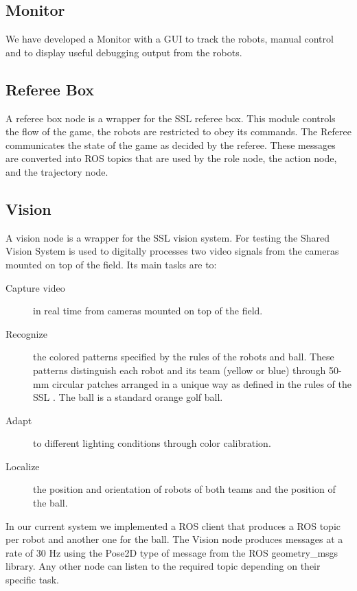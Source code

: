\documentclass[]{llncs}
\newcommand{\TODO}[1]{{\textcolor{blue}{ToDo: {#1}}}}
\begin{document}
\subsection{Monitor}
We have developed a Monitor with a GUI to track the robots, manual control and to display useful debugging output from the robots. 



\subsection{Referee Box}
A referee box node is a wrapper for the SSL referee box. This module controls the flow of the game, the robots are restricted to obey its commands. The Referee communicates the state of the game as decided by the referee. These messages are converted into ROS topics that are used by the role node, the action node, and the trajectory node.


\subsection{Vision}
A vision node is a wrapper for the SSL vision system. For testing the Shared Vision System \cite{zlbwv-sslvtsvsftrcssl-RoboCup-2009} is used to digitally processes two video signals from the cameras mounted on top of the field. Its main tasks are to:
\begin{description}
	\item[Capture video] in real time from cameras mounted on top of the field.
	\item[Recognize] the colored patterns specified by the rules of the robots and ball. These patterns distinguish each robot and its team (yellow or blue) through 50-mm circular patches arranged in a unique way as defined in the rules of the SSL \cite{robocup-ssl-rules}. The ball is a standard orange golf ball.
	\item[Adapt] to different lighting conditions through color calibration.
	\item[Localize] the position and orientation of robots of both teams and the position of the ball.
\end{description}

In our current system we implemented a ROS client that produces a ROS topic per robot and another one for the ball. The Vision node produces messages at a rate of 30 Hz using the Pose2D type of message from the ROS geometry\_msgs library. Any other node can listen to the required topic depending on their specific task.
 
\end{document}
